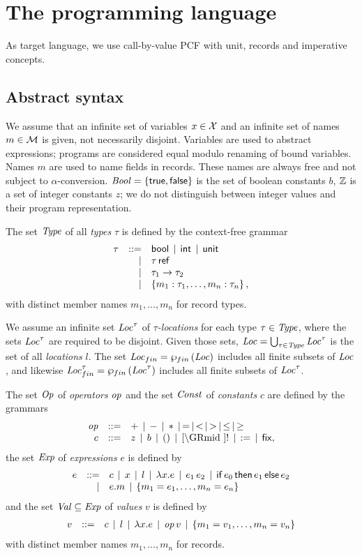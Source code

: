 \documentclass[12pt,a4paper]{report}
\begin{document}

\chapter{The programming language}

As target language, we use call-by-value PCF with unit, records and imperative concepts.



\section{Abstract syntax}

We assume that an infinite set of variables $x \in \mathcal{X}$ and an infinite
set of names $m\in \mathcal{M}$ is given, not necessarily disjoint.
Variables are used to abstract expressions; programs are considered equal modulo
renaming of bound variables. Names $m$ are used to name fields in records. These
names are always free and not subject to $\alpha$-conversion.
$\mathit{Bool} = \{\mathsf{true},\mathsf{false}\}$ is the set of boolean constants $b$,
$\mathbb Z$ is a set of integer constants $z$; we do not distinguish
between integer values and their program representation.

\begin{definition}[Types]
  The set $\mathit{Type}$ of all {\em types} $\tau$ is defined by the context-free grammar
  \[\begin{array}{rrlll}
  \tau & ::= & \mathsf{bool} \,\mid\, \mathsf{int} \,\mid\, \mathsf{unit}
          \\ & \mid & \tau\,\mathsf{ref}
          \\ & \mid & \tau_1\to\tau_2
          \\ & \mid & \left\{m_1:\tau_1,\ldots,m_n:\tau_n\right\},
  \end{array}\]
  with distinct member names $m_1,\ldots,m_n$ for record types.
\end{definition}

We assume an infinite set $\mathit{Loc}^\tau$ of {\em $\tau$-locations} for each type $\tau \in \mathit{Type}$,
where the sets $\mathit{Loc}^\tau$ are required to be disjoint. Given those sets,
$\mathit{Loc} = \bigcup_{\tau\in\mathit{Type}} \mathit{Loc}^\tau$ is the set of all {\em locations} $l$. The set
$\mathit{Loc}_{fin} = \wp_{fin}\,(\mathit{Loc})$ includes all finite subsets of $\mathit{Loc}$, and likewise $\mathit{Loc}_{fin}^\tau = \wp_{fin}\,(\mathit{Loc}^\tau)$
includes all finite subsets of $\mathit{Loc}^\tau$.

\begin{definition}[Expressions]
  The set $\mathit{Op}$ of {\em operators} $\mathit{op}$ and the set $\mathit{Const}$ of {\em constants} $c$
  are defined by the grammars
  \[\GRbeg
    \op \GRis + \GRmid - \GRmid * \GRmid = \GRmid < \GRmid > \GRmid \le \GRmid \ge \\
    c \GRis z \GRmid b \GRmid \unit \GRmid \cref \GRmid !
             \GRmid \assign \GRmid \fix,
  \GRend\]
  the set $\mathit{Exp}$ of {\em expressions} $e$ is defined by
  \[\begin{array}{rrlll}
    e & ::= & c \,\mid\, x \,\mid\, l \,\mid\, \lambda x.e \,\mid\, e_1\,e_2
           \,\mid\, \mathsf{if}\,e_0\,\mathsf{then}\,e_1\,\mathsf{else}\,e_2
           \\ & \mid & e.m \,\mid\, \left\{m_1=e_1,\ldots,m_n=e_n\right\}
  \end{array}\]
  and the set $\mathit{Val} \subseteq \mathit{Exp}$ of {\em values} $v$ is defined by
  \[\begin{array}{rrlll}
    v & ::= & c \,\mid\, l \,\mid\, \lambda x.e \,\mid\, \mathit{op}\,v \,\mid\, \left\{m_1=v_1,\ldots,m_n=v_n\right\}
  \end{array}\]
  with distinct member names $m_1,\ldots,m_n$ for records.
\end{definition}
\end{document}

